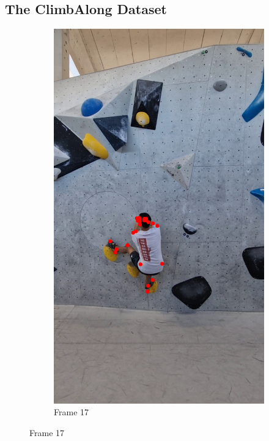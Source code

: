 \documentclass[./main.tex]{subfiles}
\begin{document}
\subsection{The ClimbAlong Dataset}
\label{sec:ClimbAlong}
\begin{figure}[htbp]
    \centering
    \begin{subfigure}{0.3\textwidth}
        \centering
        \includegraphics[width=\textwidth]{entities/CA_17.png}
        \caption{Frame 17}
    \end{subfigure}

\end{figure}
\end{document}
